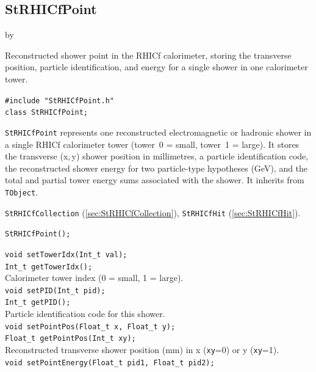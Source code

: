\documentclass[twoside]{article}
\newcommand{\entrylabel}[1]{\mbox{\textbf{{#1}}}\hfil}%
\newenvironment{entry}
{\begin{list}{}%
    {\renewcommand{\makelabel}{\entrylabel}%
     \setlength{\labelwidth}{90pt}%
     \setlength{\leftmargin}{\labelwidth}
     \advance\leftmargin by \labelsep%
      }%
    }%
  {\end{list}}
\newcommand{\Entrylabel}[1]%
{\raisebox{0pt}[1ex][0pt]{\makebox[\labelwidth][l]%
    {\parbox[t]{\labelwidth}{\hspace{0pt}\textbf{{#1}}}}}}
\newenvironment{Entry}%
{\renewcommand{\entrylabel}{\Entrylabel}\begin{entry}}%
  {\end{entry}}
\begin{document}
\subsection{StRHICfPoint}
\label{sec:StRHICfPoint}
\begin{Entry}
\item[Summary] Reconstructed shower point in the RHICf calorimeter, storing
    the transverse position, particle identification, and energy for a single
    shower in one calorimeter tower.
\item[Synopsis]
    \verb+#include "StRHICfPoint.h"+\\
    \verb+class StRHICfPoint;+\\
\item[Description]
    \texttt{StRHICfPoint} represents one reconstructed electromagnetic or
    hadronic shower in a single RHICf calorimeter tower (tower~0 = small,
    tower~1 = large).  It stores the transverse (x,\,y) shower position in
    millimetres, a particle identification code, the reconstructed shower
    energy for two particle-type hypotheses (GeV), and the total and partial
    tower energy sums associated with the shower.
    It inherits from \texttt{TObject}.
\item[Related Classes]
    \texttt{StRHICfCollection} (\ref{sec:StRHICfCollection}),
    \texttt{StRHICfHit} (\ref{sec:StRHICfHit}).
\item[Public\\ Constructors]
    \verb+StRHICfPoint();+\\
\item[Public Member\\ Functions]
    \verb+void setTowerIdx(Int_t val);+\\
    \verb+Int_t getTowerIdx();+\\
    Calorimeter tower index (0 = small, 1 = large).\\
    \verb+void setPID(Int_t pid);+\\
    \verb+Int_t getPID();+\\
    Particle identification code for this shower.\\
    \verb+void setPointPos(Float_t x, Float_t y);+\\
    \verb+Float_t getPointPos(Int_t xy);+\\
    Reconstructed transverse shower position (mm) in x (\texttt{xy}=0) or y (\texttt{xy}=1).\\
    \verb+void setPointEnergy(Float_t pid1, Float_t pid2);+\\

\end{Entry}
\end{document}
